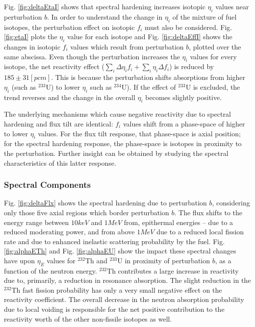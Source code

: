\documentclass[11pt]{article}
\newcommand{\iso}[2]{$^{#2}\mathrm{#1}$}
\begin{document}
Fig. \ref{fig:deltaEtaI} shows that spectral hardening increases isotopic $\eta_i$ values near perturbation $b$.
In order to understand the change in $\eta_i$ of the mixture of fuel isotopes, the perturbation effect on isotopic $f_i$ must also be considered.
Fig. \ref{fig:etaI} plots the $\eta_i$ value for each isotope and Fig. \ref{fig:deltaEffI} shows the changes in isotopic $f_i$ values which result from perturbation $b$, plotted over the same abscissa.
Even though the perturbation increases the $\eta_i$ values for every isotope, the net reactivity effect ($\sum_i{\Delta\eta_i f_i} + \sum_i{\eta_i \Delta f_i}$) is reduced by $185 \pm 31 [pcm]$.
This is because the perturbation shifts absorptions from higher $\eta_i$ (such as \iso{U}{233}) to lower $\eta_i$ such as \iso{U}{234}).
If the effect of \iso{U}{233} is excluded, the trend reverses and the change in the overall $\eta_i$ becomes slightly positive. 

The underlying mechanisms which cause negative reactivity due to spectral hardening and flux tilt are identical: $f_i$ values shift from a phase-space of higher to lower $\eta_i$ values.
For the flux tilt response, that phase-space is axial position; for the spectral hardening response, the phase-space is isotopes in proximity to the perturbation.
Further insight can be obtained by studying the spectral characteristics of this latter response.

\subsubsection{Spectral Components}

Fig. \ref{fig:deltaFlx} shows the spectral hardening due to perturbation $b$, considering only those five axial regions which border perturbation $b$.
The flux shifts to the energy range between $10 keV$ and $1 MeV$ from, epithermal energies -- due to a reduced moderating power, and from above $1 MeV$ due to a reduced local fission rate and due to enhanced inelastic scattering probability by the fuel.
Fig. \ref{fig:alphaETh} and Fig. \ref{fig:alphaEU} show the impact these spectral changes have upon $\eta_E$ values for \iso{Th}{232} and \iso{U}{233} in proximity of perturbation $b$, as a function of the neutron energy. \iso{Th}{232} contributes a large increase in reactivity due to, primarily, a reduction in resonance absorption.
The slight reduction in the \iso{Th}{232} fast fission probability has only a very small negative effect on the reactivity coefficient.
The overall decrease in the neutron absorption probability due to local voiding is responsible for the net positive contribution to the reactivity worth of the other non-fissile isotopes as well.
\end{document}
